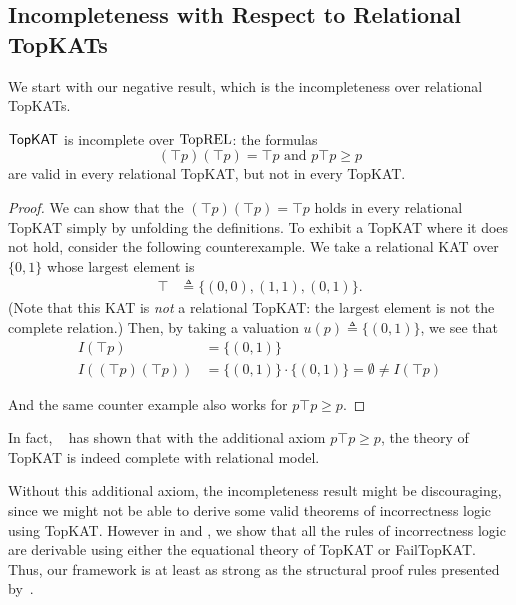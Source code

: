 \subsection{Incompleteness with Respect to Relational TopKATs}

We start with our negative result, which is the incompleteness over relational TopKATs.

\begin{theorem}\label{the: topkatstar incomplete over relational model}
  \(\mathsf{TopKAT}\) is incomplete over \(\mathbf{\mathrm{TopREL}}\): the formulas
  \[(⊤ p) (⊤ p) = ⊤ p \text{ and } p ⊤ p ≥ p\] 
  are valid in every relational TopKAT, but not in every TopKAT\@.
\end{theorem}

\begin{proof}
  We can show that the \((⊤ p) (⊤ p) = ⊤ p\) 
  holds in every relational TopKAT simply by
  unfolding the definitions.  To exhibit a TopKAT where it does not hold,
  consider the following counterexample.  We take a relational KAT over
  \(\{0,1\}\) whose largest element is
  \begin{align*}
    ⊤ & ≜ \{(0,0), (1,1), (0,1)\}.
  \end{align*}
  (Note that this KAT is \emph{not} a relational TopKAT\@: the largest
  element is not the complete relation.)
  Then, by taking a valuation \(u(p) ≜\{(0, 1)\}\), we see that
  \begin{align*}
    I(⊤ p) & = \{(0, 1)\} \\
    I((⊤ p) (⊤ p)) & 
        = \{(0, 1)\} ⋅ \{(0, 1)\} 
        = ∅ ≠ I(⊤ p)
  \end{align*}

  And the same counter example also works for 
  \(p ⊤ p ≥ p\).
\end{proof}

In fact, \citeauthor{Pous_Wagemaker_2022}~\cite{Pous_Wagemaker_2023,Pous_Wagemaker_2022} has shown that with the additional axiom \(p ⊤ p ≥ p\), the theory of TopKAT is indeed complete with relational model.

Without this additional axiom, the incompleteness result might be discouraging, since we might not be able to derive some valid theorems of incorrectness logic using TopKAT. However in  and , we show that all the rules of incorrectness logic are derivable using either the equational theory of TopKAT or FailTopKAT\@.  Thus,
our framework is at least as strong as the structural proof rules presented by~\citet{OHearn_2020}.

